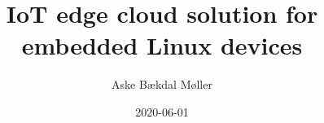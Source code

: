 \author{Aske Bækdal Møller}
\title{IoT edge cloud solution for embedded Linux devices}
\date{2020-06-01}
